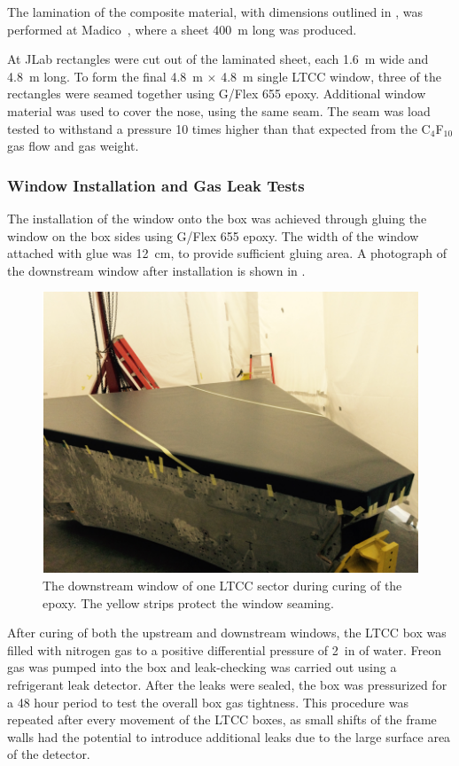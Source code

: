 The lamination of the composite material, with dimensions outlined in , was performed at
Madico~\cite{madico}, where a sheet 400~m long was produced.

At JLab rectangles were cut out of the laminated sheet, each 1.6~m wide and 4.8~m long. To form the final
4.8~m $\times$ 4.8~m single LTCC window, three of the rectangles were seamed together using G/Flex 655 epoxy.
Additional window material was used to cover the nose, using the same seam. The seam was load tested to withstand
a pressure 10 times higher than that expected from the C$_4$F$_{10}$ gas flow and gas weight.

\subsubsection{Window Installation and Gas Leak Tests}

The installation of the window onto the box was achieved through gluing the window on the box sides using G/Flex 655
epoxy. The width of the window attached with glue was 12~cm, to provide sufficient gluing area. A photograph of the
downstream window after installation is shown in .

\begin{figure}
	\centering
	\includegraphics[width=1.0\columnwidth,keepaspectratio]{img/downstreamWindow.png}
	\caption{The downstream window of one LTCC sector during curing of the epoxy. The yellow strips protect the
          window seaming.}
	\label{fig:downstreamWindow}
\end{figure}

After curing of both the upstream and downstream windows, the LTCC box was filled with nitrogen gas to a positive
differential pressure of 2~in of water. Freon gas was pumped into the box and leak-checking was carried out using a
refrigerant leak detector. After the leaks were sealed, the box was pressurized for a 48 hour period to test the
overall box gas tightness. This procedure was repeated after every movement of the LTCC boxes, as small shifts of
the frame walls had the potential to introduce additional leaks due to the large surface area of the detector.
